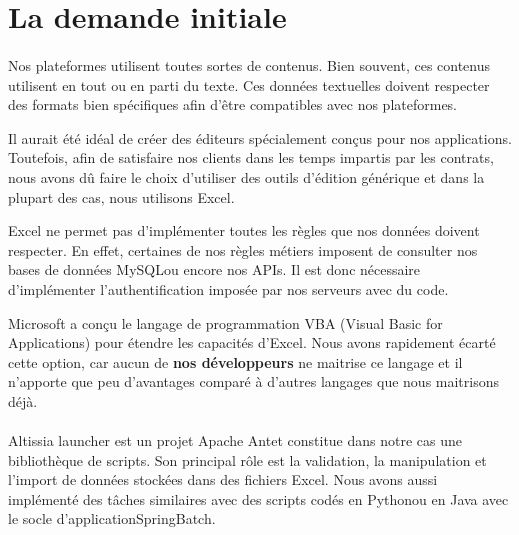\section{La demande initiale}
\label{sec:initial-request}

\paragraph{}
Nos plateformes utilisent toutes sortes de contenus.
Bien souvent, ces contenus utilisent en tout ou en parti du texte.
Ces données textuelles doivent respecter des formats bien spécifiques afin d'être compatibles avec nos plateformes.

Il aurait été idéal de créer des éditeurs spécialement conçus pour nos applications.
Toutefois, afin de satisfaire nos clients dans les temps impartis par les contrats, nous avons dû faire le choix d'utiliser des outils d'édition générique et dans la plupart des cas, nous utilisons Excel.

Excel ne permet pas d'implémenter toutes les règles que nos données doivent respecter.
En effet, certaines de nos règles métiers imposent de consulter nos bases de données MySQL\fnmark ou encore nos APIs\fnmark.
Il est donc nécessaire d'implémenter l'authentification imposée par nos serveurs avec du code.

Microsoft a conçu le langage de programmation VBA (Visual Basic for Applications) pour étendre les capacités d'Excel\cite{o365devx_pris_nodate}.
Nous avons rapidement écarté cette option, car aucun de \textbf{nos développeurs} ne maitrise ce langage et il n'apporte que peu d'avantages comparé à d'autres langages que nous maitrisons déjà.


\paragraph{}
Altissia launcher est un projet Apache Ant\fnmark et constitue dans notre cas une bibliothèque de scripts.
Son principal rôle est la validation, la manipulation et l'import de données stockées dans des fichiers Excel.
Nous avons aussi implémenté des tâches similaires avec des scripts codés en Python\fnmark ou en Java avec le socle d'application\fnmark Spring\fnmark Batch\fnmark.

